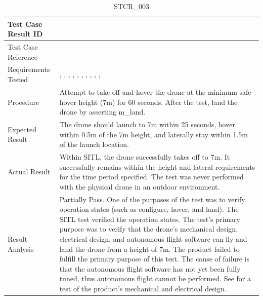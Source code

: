 \documentclass[12pt, titlepage]{article}
\begin{document}
\begin{table}[!h]
\begin{center}
\caption {STCR\_003}
\label{tab:STCR_003}
\begin{tabular}{ | m{3.2cm} | m{12.2cm} | } 
\hline
Test Case Result ID & \nameref{tab:STCR_003} \\ 
\hline
Test Case Reference & \nameref{tab:STC_003}  \\ 
\hline
Requirements Tested & \nameref{GEN_003}, \nameref{GEN_004}, \nameref{STA_000}, \nameref{STA_001}, \nameref{STA_004}, \nameref{STA_005}, \nameref{STA_006}, \nameref{TRANS_002}, \nameref{TRANS_003}, \nameref{TRANS_009}, \nameref{PERF_002} \\ 
\hline
Procedure & Attempt to take off and hover the drone at the minimum safe hover height (7m) for 60 seconds. After the test, land the drone by asserting m\_land. \\ 
\hline
Expected Result & The drone should launch to 7m within 25 seconds, hover within 0.5m of the 7m height, and laterally stay within 1.5m of the launch location.   \\ 
\hline
Actual Result & Within SITL, the drone successfully takes off to 7m. It successfully remains within the height and lateral requirements for the time period specified. The test was never performed with the physical drone in an outdoor environment.  \\ 
\hline
Result Analysis & Partially Pass. One of the purposes of the test was to verify operation states (such as configure, hover, and land). The SITL test verified the operation states. The test's primary purpose was to verify that the drone's mechanical design, electrical design, and autonomous flight software can fly and land the drone from a height of 7m. The product failed to fulfill the primary purpose of this test. The cause of failure is that the autonomous flight software has not yet been fully tuned, thus autonomous flight cannot be performed. See \nameref{tab:STCR_001} for a test of the product's mechanical and electrical design.  \\ 
\hline
\end{tabular}
\end{center}
\end{table}
\end{document}
